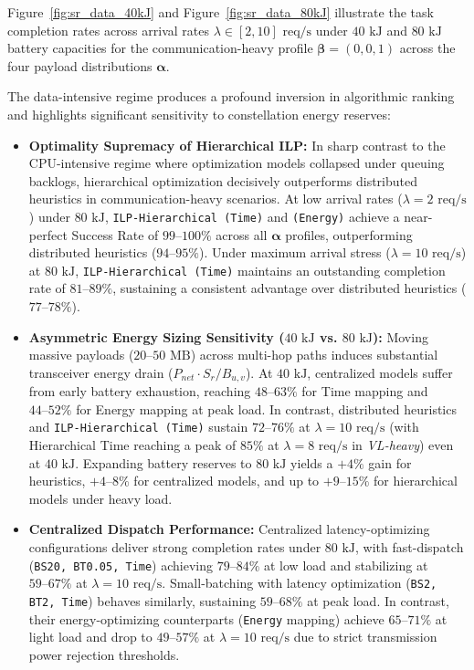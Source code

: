 Figure~\ref{fig:sr_data_40kJ} and Figure~\ref{fig:sr_data_80kJ} illustrate the task completion rates across arrival rates $\lambda \in [2, 10]\text{ req/s}$ under $40\text{ kJ}$ and $80\text{ kJ}$ battery capacities for the communication-heavy profile $\boldsymbol{\beta} = (0, 0, 1)$ across the four payload distributions $\boldsymbol{\alpha}$.

The data-intensive regime produces a profound inversion in algorithmic ranking and highlights significant sensitivity to constellation energy reserves:
\begin{itemize}
    \item \textbf{Optimality Supremacy of Hierarchical ILP:} In sharp contrast to the CPU-intensive regime where optimization models collapsed under queuing backlogs, hierarchical optimization decisively outperforms distributed heuristics in communication-heavy scenarios. At low arrival rates ($\lambda = 2\text{ req/s}$) under $80\text{ kJ}$, \texttt{ILP-Hierarchical (Time)} and \texttt{(Energy)} achieve a near-perfect Success Rate of \textbf{$99\text{--}100\%$} across all $\boldsymbol{\alpha}$ profiles, outperforming distributed heuristics ($94\text{--}95\%$). Under maximum arrival stress ($\lambda = 10\text{ req/s}$) at $80\text{ kJ}$, \texttt{ILP-Hierarchical (Time)} maintains an outstanding completion rate of \textbf{$81\text{--}89\%$}, sustaining a consistent advantage over distributed heuristics ($77\text{--}78\%$).
    \item \textbf{Asymmetric Energy Sizing Sensitivity ($40\text{ kJ}$ vs. $80\text{ kJ}$):} Moving massive payloads ($20\text{--}50\text{ MB}$) across multi-hop paths induces substantial transceiver energy drain ($P_{net} \cdot S_r / B_{u,v}$). At $40\text{ kJ}$, centralized models suffer from early battery exhaustion, reaching $48\text{--}63\%$ for Time mapping and $44\text{--}52\%$ for Energy mapping at peak load. In contrast, distributed heuristics and \texttt{ILP-Hierarchical (Time)} sustain $72\text{--}76\%$ at $\lambda = 10\text{ req/s}$ (with Hierarchical Time reaching a peak of $85\%$ at $\lambda = 8\text{ req/s}$ in \textit{VL-heavy}) even at $40\text{ kJ}$. Expanding battery reserves to $80\text{ kJ}$ yields a $+4\%$ gain for heuristics, $+4\text{--}8\%$ for centralized models, and up to $+9\text{--}15\%$ for hierarchical models under heavy load.
    \item \textbf{Centralized Dispatch Performance:} Centralized latency-optimizing configurations deliver strong completion rates under $80\text{ kJ}$, with fast-dispatch (\texttt{BS20, BT0.05, Time}) achieving $79\text{--}84\%$ at low load and stabilizing at $59\text{--}67\%$ at $\lambda = 10\text{ req/s}$. Small-batching with latency optimization (\texttt{BS2, BT2, Time}) behaves similarly, sustaining $59\text{--}68\%$ at peak load. In contrast, their energy-optimizing counterparts (\texttt{Energy} mapping) achieve $65\text{--}71\%$ at light load and drop to $49\text{--}57\%$ at $\lambda = 10\text{ req/s}$ due to strict transmission power rejection thresholds.
\end{itemize}
\FloatBarrier

